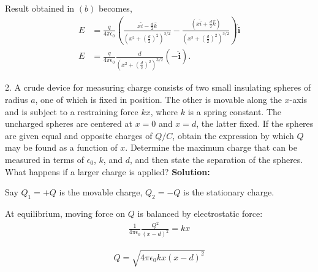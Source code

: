 \documentclass{article}
\begin{document}
Result obtained in $(b)$ becomes,
\begin{align*}
E &= \frac{q}{4 \pi \epsilon_0} 
\left( 
\frac{x\hat{i} - \frac{d}{2} \hat{k}}{\left(x^2 + \left(\frac{d}{2}\right)^2\right)^{3/2}} 
- 
\frac{\left(x \hat{i} + \frac{d}{2}\hat{k}\right)}{\left(x^2 + \left(\frac{d}{2}\right)^2\right)^{3/2}}
\right) \mathbf{\hat{i}} 
\\
E &= \frac{q}{4 \pi \epsilon_0} 
\frac{d}{\left(x^2 + \left(\frac{d}{2}\right)^2\right)^{3/2}} (-\mathbf{\hat{i}}).
\end{align*}

2. A crude device for measuring charge consists of two small insulating spheres of radius $a$, one of which is fixed in position. The other is movable along the $x$-axis and is subject to a restraining force $kx$, where $k$ is a spring constant. The uncharged spheres are centered at $x = 0$ and $x = d$, the latter fixed. If the spheres are given equal and opposite charges of $Q/C$, obtain the expression by which $Q$ may be found as a function of $x$. Determine the maximum charge that can be measured in terms of $\epsilon_0$, $k$, and $d$, and then state the separation of the spheres. What happens if a larger charge is applied? \newline
\textbf{Solution:} \newline
\begin{figure}[!ht]
\centering
{}%

\label{fig:my_label}
\end{figure}
Say $Q_1 = +Q$ is the movable charge, $Q_2 = -Q$ is the stationary charge.

At equilibrium, moving force on $Q$ is balanced by electrostatic force:
\begin{align*}
\frac{1}{4 \pi \epsilon_0} \frac{Q^2}{(x-d)^2} = kx
\end{align*}

\begin{align*}
Q = \sqrt{4 \pi \epsilon_0 k x (x-d)^2}
\end{align*}
\end{document}
